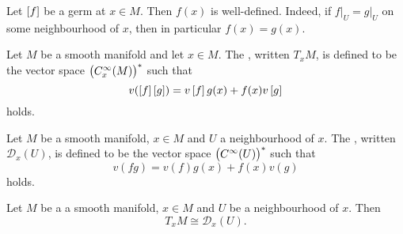 \begin{remark}
	Let $\sbr[0]{f}$ be a germ at $x \in M$. Then $f(x)$ is well-defined. Indeed, if $f\vert_U = g\vert_U$ on some neighbourhood of $x$, then in particular $f(x) = g(x)$.
\end{remark}

\begin{definition}
	Let $M$ be a smooth manifold and let $x \in M$. The , written $T_xM$, is defined to be the vector space $\del[1]{C^\infty_x(M)}^*$ such that
	\begin{equation*}
		v(\sbr[0]{f}\sbr[0]{g}) = v\sbr[0]{f}g(x) + f(x)v\sbr[0]{g}
	\end{equation*}
	\noindent holds.
\end{definition}

\begin{definition}[Derivation]
	Let $M$ be a smooth manifold, $x \in M$ and $U$ a neighbourhood of $x$. The , written $\mathcal{D}_x(U)$, is defined to be the vector space $\del[1]{C^\infty(U)}^*$ such that
	\begin{equation*}
		v(fg) = v(f)g(x) + f(x)v(g)
	\end{equation*}
	\noindent holds.
\end{definition}

\begin{proposition}
	\label{prop:isomorphism_tangent_space}
	Let $M$ be a a smooth manifold, $x \in M$ and $U$ be a neighbourhood of $x$. Then
	\begin{equation*}
		T_xM \cong \mathcal{D}_x(U).
	\end{equation*}
\end{proposition}

